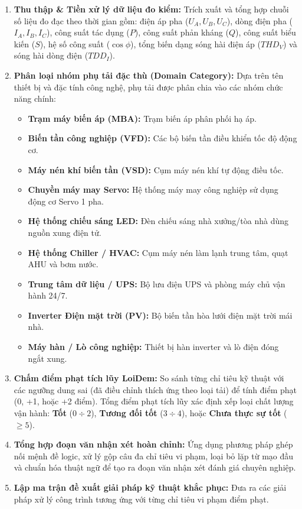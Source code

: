 \documentclass[12pt,a4paper]{article}
\begin{document}
\begin{enumerate}
  \item \textbf{Thu thập \& Tiền xử lý dữ liệu đo kiểm:}
  Trích xuất và tổng hợp chuỗi số liệu đo đạc theo thời gian gồm: điện áp pha ($U_A, U_B, U_C$), dòng điện pha ($I_A, I_B, I_C$), công suất tác dụng ($P$), công suất phản kháng ($Q$), công suất biểu kiến ($S$), hệ số công suất ($\cos\phi$), tổng biến dạng sóng hài điện áp ($THD_V$) và sóng hài dòng điện ($TDD_I$).

  \item \textbf{Phân loại nhóm phụ tải đặc thù (Domain Category):}
  Dựa trên tên thiết bị và đặc tính công nghệ, phụ tải được phân chia vào các nhóm chức năng chính:
  \begin{itemize}
    \item \textbf{Trạm máy biến áp (MBA):} Trạm biến áp phân phối hạ áp.
    \item \textbf{Biến tần công nghiệp (VFD):} Các bộ biến tần điều khiển tốc độ động cơ.
    \item \textbf{Máy nén khí biến tần (VSD):} Cụm máy nén khí tự động điều tốc.
    \item \textbf{Chuyền máy may Servo:} Hệ thống máy may công nghiệp sử dụng động cơ Servo 1 pha.
    \item \textbf{Hệ thống chiếu sáng LED:} Đèn chiếu sáng nhà xưởng/tòa nhà dùng nguồn xung điện tử.
    \item \textbf{Hệ thống Chiller / HVAC:} Cụm máy nén làm lạnh trung tâm, quạt AHU và bơm nước.
    \item \textbf{Trung tâm dữ liệu / UPS:} Bộ lưu điện UPS và phòng máy chủ vận hành 24/7.
    \item \textbf{Inverter Điện mặt trời (PV):} Bộ biến tần hòa lưới điện mặt trời mái nhà.
    \item \textbf{Máy hàn / Lò công nghiệp:} Thiết bị hàn inverter và lò điện đóng ngắt xung.
  \end{itemize}

  \item \textbf{Chấm điểm phạt tích lũy LoiDem:}
  So sánh từng chỉ tiêu kỹ thuật với các ngưỡng dung sai (đã điều chỉnh thích ứng theo loại tải) để tính điểm phạt (0, +1, hoặc +2 điểm). Tổng điểm phạt tích lũy xác định xếp loại chất lượng vận hành: \textbf{Tốt} ($0\div2$), \textbf{Tương đối tốt} ($3\div4$), hoặc \textbf{Chưa thực sự tốt} ($\ge5$).

  \item \textbf{Tổng hợp đoạn văn nhận xét hoàn chỉnh:}
  Ứng dụng phương pháp ghép nối mệnh đề logic, xử lý gộp câu đa chỉ tiêu vi phạm, loại bỏ lặp từ mạo đầu và chuẩn hóa thuật ngữ để tạo ra đoạn văn nhận xét đánh giá chuyên nghiệp.

  \item \textbf{Lập ma trận đề xuất giải pháp kỹ thuật khắc phục:}
  Đưa ra các giải pháp xử lý công trình tương ứng với từng chỉ tiêu vi phạm điểm phạt.
\end{enumerate}
\end{document}

